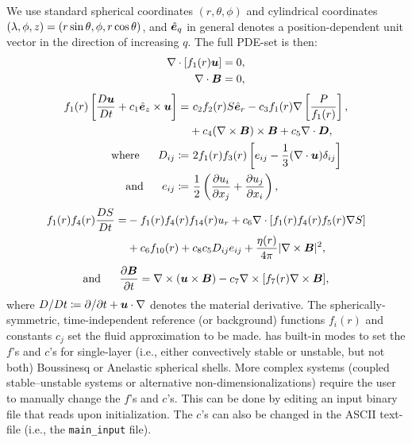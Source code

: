 \documentclass[12pt]{article}
\numberwithin{equation}{section}
\begin{document}
	We use standard spherical coordinates $(r,\theta,\phi)$ and cylindrical coordinates $(\lambda,\phi,z) = (r\sin\theta,\phi, r\cos\theta)$, and $\hat{\bm{e}}_q$ in general denotes a position-dependent unit vector in the direction of increasing $q$. The full PDE-set is then:
	\begin{align}
	\nabla\cdot[f_1(r)\bm{u}] &= 0\label{eq:contgen},\\
	\nabla\cdot \bm{B} &= 0,
\end{align}
\begin{subequations}\label{eq:momgen}
	\begin{align}
		f_1\ofr\left[\matderiv{\vecu}+c_1\ez\times\vecu\right] =&\ c_2f_2\ofr S\er - c_3 f_1\ofr\nabla\left[ \frac{P}{f_1\ofr} \right], \nonumber\\
		& +c_4(\curl\vecb)\times\vecb+c_5\Div\bm{D},\\
		\where D_{ij} \define&\ 2f_1\ofr f_3\ofr \left[e_{ij} - \frac{1}{3}(\Div\vecu) \delta_{ij} \right]\label{eq:dstressgen}\\
		\andd e_{ij} \define&\ \frac{1}{2}\left(\pderiv{u_i}{x_j} + \pderiv{u_j}{x_i} \right),\label{eq:estressgen}
	\end{align}
\end{subequations}
\begin{align}\label{eq:engen}
	f_1(r) f_4(r) \frac{DS}{Dt} = &- f_1(r) f_4(r) f_{14}(r) u_r + c_6\nabla\cdot[f_1(r) f_4(r) f_5(r) \nabla S] \nonumber \\
	&+ c_6f_{10}(r) + c_8 c_5 D_{ij}e_{ij} + \frac{\eta(r)}{4\pi}|\nabla\times\bm{B}|^2,
\end{align}
\begin{align}\label{eq:indgen}
	\text{and}\ \ \ \ \  \frac{\partial\bm{B}}{\partial t} = \nabla\times(\bm{u}\times\bm{B}) - c_7\nabla\times[f_7(r)\nabla\times\bm{B}],
\end{align}
where $D/Dt\coloneqq \partial/\partial t+\bm{u}\cdot\nabla$ denotes the material derivative. 
	The spherically-symmetric, time-independent reference (or background) functions $f_i(r)$ and constants $c_j$ set the fluid approximation to be made. {\rayleigh} has built-in modes to set the $f$'s and $c$'s for single-layer (i.e., either convectively stable or unstable, but not both) Boussinesq or Anelastic spherical shells. More complex systems (coupled stable--unstable systems or alternative non-dimensionalizations) require the user to manually change the $f$'s and $c$'s. This can be done by editing an input binary file that {\rayleigh} reads upon initialization. The $c$'s can also be changed in the ASCII text-file (i.e., the \texttt{main\_input} file). 
	
\end{document}
